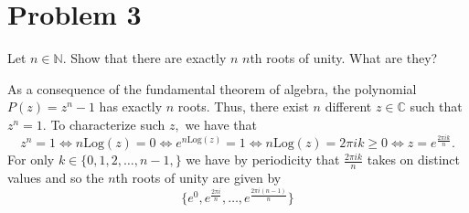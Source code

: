 \documentclass[11pt]{article}
\newcommand{\bbC}{\mathbb{C}}
\newcommand{\bbN}{\mathbb{N}}
\begin{document}
\newpage
\section*{Problem 3}
\begin{problem}
    Let $n \in \bbN.$ Show that there are exactly $n$ $n$th roots of unity. What are they?
\end{problem}
\begin{solution}
As a consequence of the fundamental theorem of algebra, the polynomial $P(z) = z^n - 1$ has exactly $n$ roots. Thus, there exist $n$ different $z\in \bbC$ such that $z^n = 1.$ To characterize such $z,$ we have that
\[z^n = 1 \iff n\text{Log}(z) = 0 \iff e^{n\text{Log}(z)} = 1 \iff n\text{Log}(z) = 2\pi i k \geq 0 \iff z = e^{\frac{2\pi i k}{n}}.\] For only $k \in \{0,1,2,\dots, n-1,\}$ we have by periodicity that $\frac{2\pi i k}{n}$ takes on distinct values and so the $n$th roots of unity are given by 
\[\boxed{\{e^0, e^{\frac{2\pi i}{n}}, \dots, e^{\frac{2\pi i(n-1)}{n}}\}}\]
\end{solution}

\newpage
\end{document}
